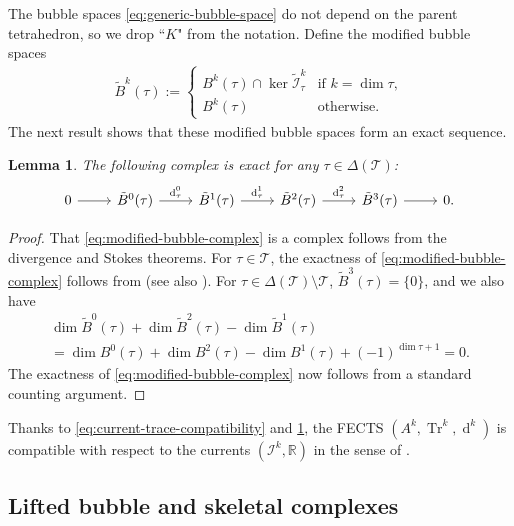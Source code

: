 \documentclass{mcom-l}
\newtheorem{lemma}[theorem]{Lemma}
\theoremstyle{definition}
\theoremstyle{remark}
\numberwithin{equation}{section}
\DeclareMathOperator{\dee}{d}
\DeclareMathOperator{\Tr}{Tr}
\newcommand{\mesh}[0]{\mathcal{T}}
\begin{document}
The bubble spaces \cref{eq:generic-bubble-space} do not depend on the parent 
tetrahedron, so we drop ``$K$" from the notation. Define the modified 
bubble spaces 
\begin{align*}
	\tilde{B}^k(\tau) := \begin{cases}
		B^k(\tau) \cap \ker \tilde{\mathcal{I}}_{\tau}^k 
		& \text{if } k = \dim \tau, \\
		B^k(\tau) & \text{otherwise}.
	\end{cases}
\end{align*}
The next result shows that these modified bubble spaces form an exact 
sequence.
\begin{lemma}
	\label{lem:current-bubble-exactness}
	The following complex is exact for any $\tau \in \Delta(\mesh)$:
	\begin{equation}
		\label{eq:modified-bubble-complex}
		\begin{tikzcd}[ampersand replacement = \&]
			0 \arrow[r] 
			\& \tilde{B}^0(\tau) \arrow[r, "\dee_{\tau}^0"]
			\& \tilde{B}^1(\tau) \arrow[r, "\dee_{\tau}^1"] 
			\& \tilde{B}^2(\tau) \arrow[r, "\dee_{\tau}^2"] 
			\& \tilde{B}^3(\tau) \arrow[r] 
			\& 0.
		\end{tikzcd}
	\end{equation}
\end{lemma}
\begin{proof}
	That \cref{eq:modified-bubble-complex} is a complex follows from 
	the divergence and Stokes theorems. 
	For $\tau \in \mesh$, the exactness of 
	\cref{eq:modified-bubble-complex} follows from 
	\cite[Theorems 3.1-2.2 and Corollaries 3.4-3.6]{FuGuzmanNeilan20}
	(see also \cite[p.1071]{FuGuzmanNeilan20}). 
	For $\tau \in \Delta(\mesh) \setminus \mesh$, 
	$\tilde{B}^3(\tau) = \{0\}$, and we also have 
	\begin{multline*}
		\dim \tilde{B}^0(\tau) + \dim \tilde{B}^2(\tau) 
		- \dim \tilde{B}^1(\tau) \\
		= \dim B^0(\tau) + \dim B^2(\tau) - \dim B^1(\tau) 
		+ (-1)^{\dim \tau + 1} 
		= 0.
	\end{multline*}
	The exactness of \cref{eq:modified-bubble-complex} now follows from a 
	standard counting argument. 
\end{proof}
\noindent Thanks to \cref{eq:current-trace-compatibility}
and \cref{lem:current-bubble-exactness}, the FECTS
$(A^k, \Tr^k, \dee^k)$ is compatible with respect to the currents 
$(\mathcal{I}^k, \mathbb{R})$ in the sense of 
\cite[Definition 2.7]{HuLiangLin25}.

\subsection{Lifted bubble and skeletal complexes}
\end{document}
